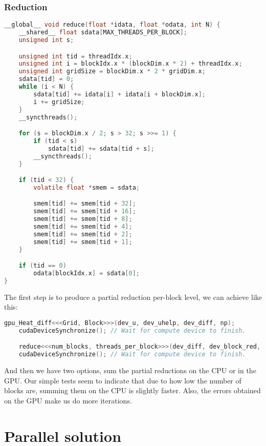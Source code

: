 \documentclass[a4paper, 10pt]{article}
\begin{document}
\subsubsection{Reduction}
\begin{lstlisting}[language=c, caption={Reduction kernel}]
__global__ void reduce(float *idata, float *odata, int N) {
    __shared__ float sdata[MAX_THREADS_PER_BLOCK];
    unsigned int s;

    unsigned int tid = threadIdx.x;
    unsigned int i = blockIdx.x * (blockDim.x * 2) + threadIdx.x;
    unsigned int gridSize = blockDim.x * 2 * gridDim.x;
    sdata[tid] = 0;
    while (i < N) {
        sdata[tid] += idata[i] + idata[i + blockDim.x];
        i += gridSize;
    }
    __syncthreads();

    for (s = blockDim.x / 2; s > 32; s >>= 1) {
        if (tid < s)
            sdata[tid] += sdata[tid + s];
        __syncthreads();
    }

    if (tid < 32) {
        volatile float *smem = sdata;

        smem[tid] += smem[tid + 32];
        smem[tid] += smem[tid + 16];
        smem[tid] += smem[tid + 8];
        smem[tid] += smem[tid + 4];
        smem[tid] += smem[tid + 2];
        smem[tid] += smem[tid + 1];
    }

    if (tid == 0)
        odata[blockIdx.x] = sdata[0];
}
\end{lstlisting}

The first step is to produce a partial reduction per-block level, we can achieve like this:
\begin{lstlisting}[language=c, caption={Reduction}, label={lst:cudareduction_block}]
    gpu_Heat_diff<<<Grid, Block>>>(dev_u, dev_uhelp, dev_diff, np);
    cudaDeviceSynchronize(); // Wait for compute device to finish.

    reduce<<<num_blocks, threads_per_block>>>(dev_diff, dev_block_red, (np - 2) * (np - 2));
    cudaDeviceSynchronize(); // Wait for compute device to finish.
\end{lstlisting}

And then we have two options, sum the partial reductions on the CPU or in the GPU. Our simple tests seem to indicate
that due to how low the number of blocks are, summing them on the CPU is slightly faster. Also, the errors obtained on the GPU
make us do more iterations.
\clearpage
\section{Parallel solution}
\end{document}
